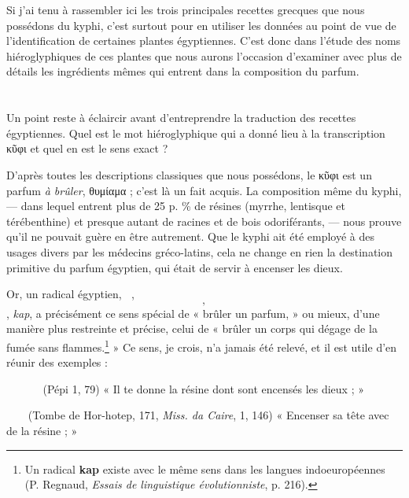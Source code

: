 \documentclass[a4paper, 11pt, oneside, landscape]{article}
\newcommand*\hieroAAAA{\raisebox{0.8ex}{}}
\newcommand*\hieroAAAB{}
\newcommand*\hieroAAAC{\raisebox{0.6ex}{}}
\newcommand*\hieroAAAD{}
\newcommand*\hieroAAAE{}
\newcommand*\hieroAAAF{}
\newcommand*\hieroAAAG{}
\newcommand*\hieroAAAH{}
\newcommand*\hieroAAAI{}
\newcommand*\hieroAAAJ{}
\newcommand*\hieroAAAK{}
\newcommand*\hieroAAAL{}
\newcommand*\hieroAAAM{}
\newcommand*\hieroAAAN{}
\newcommand*\hieroAAAO{}
\newcommand*\hieroAAAP{}
\newcommand*\hieroAAAQ{}
\newcommand*\hieroAAAR{}
\begin{document}
Si j'ai tenu à rassembler ici les trois principales recettes grecques que nous possédons du kyphi, c'est surtout pour en utiliser les données au point de vue de l'identification de certaines plantes égyptiennes. C'est donc dans l'étude des noms hiéroglyphiques de ces plantes que nous aurons l'occasion d'examiner avec plus de détails les ingrédients mêmes qui entrent dans la composition du parfum.
\clearpage
\section{}
\paragraph{}
Un point reste à éclaircir avant d'entreprendre la traduction des recettes égyptiennes. Quel est le mot hiéroglyphique qui a donné lieu à la transcription κῦφι et quel en est le sens exact ?

D'après toutes les descriptions classiques que nous possédons, le κῦφι est un parfum \emph{à brûler}, θυμίαμα ; c'est là un fait acquis. La composition même du kyphi, --- dans lequel entrent plus de 25 p. \% de résines (myrrhe, lentisque et térébenthine) et presque autant de racines et de bois odoriférants, --- nous prouve qu'il ne pouvait guère en être autrement. Que le kyphi ait été employé à des usages divers par les médecins gréco-latins, cela ne change en rien la destination primitive du parfum égyptien, qui était de servir à encenser les dieux.

Or, un radical égyptien, $\hieroAAAA\:\hieroAAAB\:\hieroAAAC$, $\hieroAAAD$, $\hieroAAAE$, \emph{kap}, a précisément ce sens spécial de « brûler un parfum, » ou mieux, d'une manière plus restreinte et précise, celui de « brûler un corps qui dégage de la fumée sans flammes.\footnote{Un radical \textbf{kap} existe avec le même sens dans les langues indoeuropéennes (P. Regnaud, \emph{Essais de linguistique évolutionniste}, p. 216).} » Ce sens, je crois, n'a jamais été relevé, et il est utile d'en réunir des exemples :

$\hieroAAAF\:\hieroAAAG\:\hieroAAAH\:\hieroAAAI\:\hieroAAAJ\:\hieroAAAA\:\hieroAAAB\:\hieroAAAK\:\hieroAAAL\:\hieroAAAI\:\hieroAAAI\:\hieroAAAI\:\hieroAAAM\:\hieroAAAN$ (Pépi 1, 79) « Il te donne la résine dont sont encensés les dieux ; »

$\hieroAAAA\:\hieroAAAB\:\hieroAAAO\:\hieroAAAP\:\hieroAAAN\:\hieroAAAH\:\hieroAAAQ\:\hieroAAAR$ (Tombe de Hor-hotep, 171, \emph{Miss. da Caire}, 1, 146) « Encenser sa tête avec de la résine ; »
\end{document}
